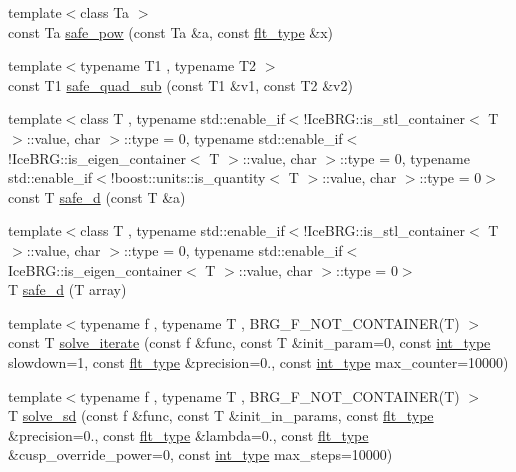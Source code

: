 \begin{DoxyCompactItemize}
\item 
{\footnotesize template$<$class Ta $>$ }\\const Ta \hyperlink{namespaceIceBRG_ae960572dedc59ab5314b423617082dbd}{safe\+\_\+pow} (const Ta \&a, const \hyperlink{lib_2IceBRG__main_2common_8h_ad0f130a56eeb944d9ef2692ee881ecc4}{flt\+\_\+type} \&x)
\item 
{\footnotesize template$<$typename T1 , typename T2 $>$ }\\const T1 \hyperlink{namespaceIceBRG_abe9f946b5055d9c54a76fa82371bc8e4}{safe\+\_\+quad\+\_\+sub} (const T1 \&v1, const T2 \&v2)
\item 
{\footnotesize template$<$class T , typename std\+::enable\+\_\+if$<$!\+Ice\+B\+R\+G\+::is\+\_\+stl\+\_\+container$<$ T $>$\+::value, char $>$\+::type  = 0, typename std\+::enable\+\_\+if$<$!\+Ice\+B\+R\+G\+::is\+\_\+eigen\+\_\+container$<$ T $>$\+::value, char $>$\+::type  = 0, typename std\+::enable\+\_\+if$<$!boost\+::units\+::is\+\_\+quantity$<$ T $>$\+::value, char $>$\+::type  = 0$>$ }\\const T \hyperlink{namespaceIceBRG_a01edeedeadd173dccf4cc4a82f49ebfd}{safe\+\_\+d} (const T \&a)
\item 
{\footnotesize template$<$class T , typename std\+::enable\+\_\+if$<$!\+Ice\+B\+R\+G\+::is\+\_\+stl\+\_\+container$<$ T $>$\+::value, char $>$\+::type  = 0, typename std\+::enable\+\_\+if$<$ Ice\+B\+R\+G\+::is\+\_\+eigen\+\_\+container$<$ T $>$\+::value, char $>$\+::type  = 0$>$ }\\T \hyperlink{namespaceIceBRG_aa9da8e44096a08c6f97c598ffe1e1713}{safe\+\_\+d} (T array)
\item 
{\footnotesize template$<$typename f , typename T , B\+R\+G\+\_\+\+F\+\_\+\+N\+O\+T\+\_\+\+C\+O\+N\+T\+A\+I\+N\+E\+R(\+T) $>$ }\\const T \hyperlink{namespaceIceBRG_aba08cc0e1042eef39f76f91fb7342a7b}{solve\+\_\+iterate} (const f \&func, const T \&init\+\_\+param=0, const \hyperlink{lib_2IceBRG__main_2common_8h_ac4de9d9335536ac22821171deec8d39e}{int\+\_\+type} slowdown=1, const \hyperlink{lib_2IceBRG__main_2common_8h_ad0f130a56eeb944d9ef2692ee881ecc4}{flt\+\_\+type} \&precision=0., const \hyperlink{lib_2IceBRG__main_2common_8h_ac4de9d9335536ac22821171deec8d39e}{int\+\_\+type} max\+\_\+counter=10000)
\item 
{\footnotesize template$<$typename f , typename T , B\+R\+G\+\_\+\+F\+\_\+\+N\+O\+T\+\_\+\+C\+O\+N\+T\+A\+I\+N\+E\+R(\+T) $>$ }\\T \hyperlink{namespaceIceBRG_a6004428eeca5db8cfd9c372d359059e9}{solve\+\_\+sd} (const f \&func, const T \&init\+\_\+in\+\_\+params, const \hyperlink{lib_2IceBRG__main_2common_8h_ad0f130a56eeb944d9ef2692ee881ecc4}{flt\+\_\+type} \&precision=0., const \hyperlink{lib_2IceBRG__main_2common_8h_ad0f130a56eeb944d9ef2692ee881ecc4}{flt\+\_\+type} \&lambda=0., const \hyperlink{lib_2IceBRG__main_2common_8h_ad0f130a56eeb944d9ef2692ee881ecc4}{flt\+\_\+type} \&cusp\+\_\+override\+\_\+power=0, const \hyperlink{lib_2IceBRG__main_2common_8h_ac4de9d9335536ac22821171deec8d39e}{int\+\_\+type} max\+\_\+steps=10000)

\end{DoxyCompactItemize}
